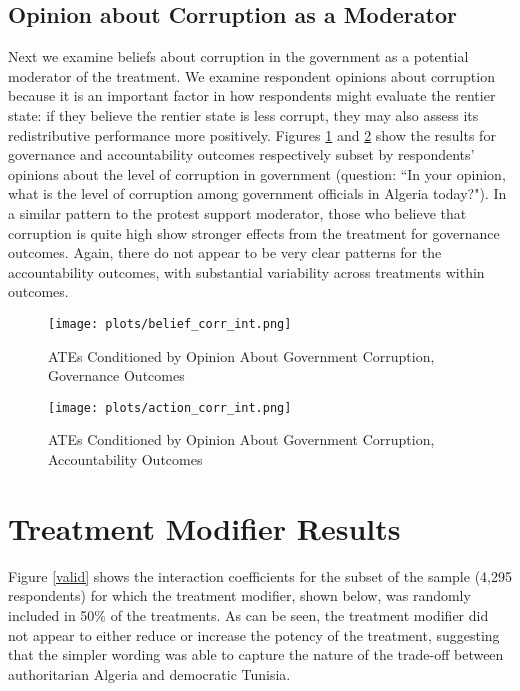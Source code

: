 \documentclass[12pt, letterpaper]{article}
\begin{document}
\subsection*{Opinion about Corruption as a Moderator}

Next we examine beliefs about corruption in the government as a potential moderator of the treatment. We examine respondent opinions about corruption because it is an important factor in how respondents might evaluate the rentier state: if they believe the rentier state is less corrupt, they may also assess its redistributive performance more positively. Figures \ref{fig:beliefcorr} and \ref{fig:actioncorr} show the results for governance and accountability outcomes respectively subset by respondents' opinions about the level of corruption in government (question: ``In your opinion, what is the level of corruption among government officials in Algeria today?"). In a similar pattern to the protest support moderator, those who believe that corruption is quite high show stronger effects from the treatment for governance outcomes. Again, there do not appear to be very clear patterns for the accountability outcomes, with substantial variability across treatments within outcomes. 
 
\begin{figure}
    \centering
    \texttt{[image: plots/belief\_corr\_int.png]}
    \caption{ATEs Conditioned by Opinion About Government Corruption, Governance Outcomes}
    \label{fig:beliefcorr}
\end{figure}

\begin{figure}
    \centering
    \texttt{[image: plots/action\_corr\_int.png]}
    \caption{ATEs Conditioned by Opinion About Government Corruption, Accountability Outcomes}
    \label{fig:actioncorr}
\end{figure}

\newpage

\section{Treatment Modifier Results}

Figure \ref{valid} shows the interaction coefficients for the subset of the sample (4,295 respondents) for which the treatment modifier, shown below, was randomly included in 50\% of the treatments. As can be seen, the treatment modifier did not appear to either reduce or increase the potency of the treatment, suggesting that the simpler wording was able to capture the nature of the trade-off between authoritarian Algeria and democratic Tunisia.
\end{document}
